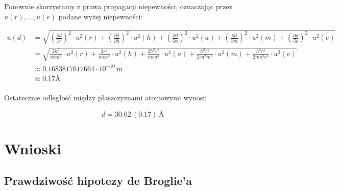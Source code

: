 \documentclass[a4paper]{article}
\begin{document}
Ponownie skorzystamy z prawa propagacji niepewności, oznaczając przez $u(r), \dots, u(e)$ podane wyżej niepewności:

\begin{align*}
	u(d) &= \sqrt{
		\left( \frac{\partial d}{\partial r} \right)^2 \cdot u^2(r) +
		\left( \frac{\partial d}{\partial h} \right)^2 \cdot u^2(h) +
                \left( \frac{\partial d}{\partial a} \right)^2 \cdot u^2(a) +
                \left( \frac{\partial d}{\partial m} \right)^2 \cdot u^2(m) +
                \left( \frac{\partial d}{\partial e} \right)^2 \cdot u^2(e)
	} \\
	&= \sqrt{
		\frac{2h^2}{mea^2} \cdot u^2(r) +
		\frac{2r^2}{mea^2} \cdot u^2(h) +
		\frac{2h^2r^2}{mea^4} \cdot u^2(a) +
		\frac{h^2r^2}{2e a^2 m^3} \cdot u^2(m) +
		\frac{h^2r^2}{2m a^2 e^3} \cdot u^2(e)
	} \\
	&\approx 0.1683817617664 \cdot 10^{-10} \, \text{m} \\
	&\approx 0.17 \text{Å} \\
\end{align*}

Ostatecznie odległość między płaszczyznami atomowymi wynosi:

$$d = 30.62 \, (0.17) \, \text{Å} $$

\section{Wnioski}

\subsection{Prawdziwość hipotezy de Broglie'a}
\end{document}
